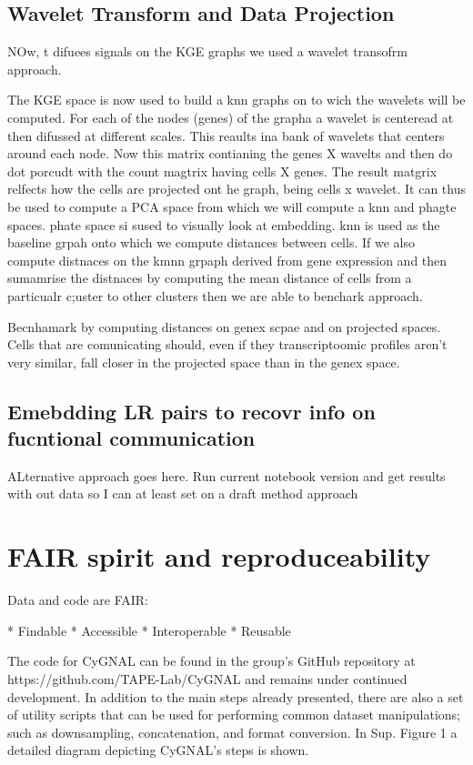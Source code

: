 \subsection*{Wavelet Transform and Data Projection}

NOw, t difuees signals on the KGE graphs we used a wavelet transofrm approach.

The KGE space is now used to build a knn graphs on to wich the wavelets will be computed. For each of the nodes (genes) of the grapha a wavelet is centeread at then difussed at different scales. This reaults ina  bank of wavelets that centers around each node. 
Now this matrix contianing the genes X wavelts  and then do dot porcudt with the count magtrix having cells X genes. The result matgrix relfects how the cells are projected ont he graph, being cells x wavelet.
It can thus be used to compute a PCA space from which we will compute a knn and phagte spaces. phate space si sused to visually look at embedding. knn is used as the baseline grpah onto which we compute distances between cells.
If we also compute distnaces on the kmnn grpaph derived from gene expression and then sumamrise the distnaces by computing the mean distance of cells from a particualr c;uster to other clusters then we are able to benchark approach.

Becnhamark by computing distances on genex scpae and on projected spaces. Cells that are comunicating should, even if they transcriptoomic profiles aren't very similar, fall closer in the projected space than in the genex space.


\subsection*{Emebdding LR pairs to recovr info on fucntional communication}


ALternative approach goes here. Run current notebook version and get results with out data so I can at least set on a draft method approach



\section{FAIR spirit and reproduceability}

Data and code are FAIR:

* Findable
* Accessible
* Interoperable
* Reusable

The code for CyGNAL can be found in the group’s GitHub repository at  https://github.com/TAPE-Lab/CyGNAL and remains under continued development. In addition to the main steps already presented, there are also a set of utility scripts that can be used for performing common dataset manipulations; such as downsampling, concatenation, and format conversion. In Sup. Figure 1 a detailed diagram depicting CyGNAL’s steps is shown.








